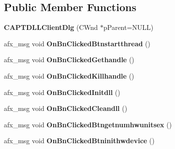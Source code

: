 \subsection*{Public Member Functions}
\begin{DoxyCompactItemize}
\item 
{\bfseries C\+A\+P\+T\+D\+L\+L\+Client\+Dlg} (C\+Wnd $\ast$p\+Parent=N\+U\+LL)\hypertarget{class_c_a_p_t_d_l_l_client_dlg_a697f84919ce4b0bfb2f05746bde3e02a}{}\label{class_c_a_p_t_d_l_l_client_dlg_a697f84919ce4b0bfb2f05746bde3e02a}

\item 
afx\+\_\+msg void {\bfseries On\+Bn\+Clicked\+Btnstartthread} ()\hypertarget{class_c_a_p_t_d_l_l_client_dlg_ac2eee9e2db144b21bb84a856bd5545a6}{}\label{class_c_a_p_t_d_l_l_client_dlg_ac2eee9e2db144b21bb84a856bd5545a6}

\item 
afx\+\_\+msg void {\bfseries On\+Bn\+Clicked\+Gethandle} ()\hypertarget{class_c_a_p_t_d_l_l_client_dlg_a4d648f9524c62291f0d492aa9c005e76}{}\label{class_c_a_p_t_d_l_l_client_dlg_a4d648f9524c62291f0d492aa9c005e76}

\item 
afx\+\_\+msg void {\bfseries On\+Bn\+Clicked\+Killhandle} ()\hypertarget{class_c_a_p_t_d_l_l_client_dlg_ac929793529ec7c2bdf2ec2328b2f7eb6}{}\label{class_c_a_p_t_d_l_l_client_dlg_ac929793529ec7c2bdf2ec2328b2f7eb6}

\item 
afx\+\_\+msg void {\bfseries On\+Bn\+Clicked\+Initdll} ()\hypertarget{class_c_a_p_t_d_l_l_client_dlg_a0f4b47bac8eb0266321bee111d55a9ac}{}\label{class_c_a_p_t_d_l_l_client_dlg_a0f4b47bac8eb0266321bee111d55a9ac}

\item 
afx\+\_\+msg void {\bfseries On\+Bn\+Clicked\+Cleandll} ()\hypertarget{class_c_a_p_t_d_l_l_client_dlg_acbe403ef895a35b76c64348e822e8afd}{}\label{class_c_a_p_t_d_l_l_client_dlg_acbe403ef895a35b76c64348e822e8afd}

\item 
afx\+\_\+msg void {\bfseries On\+Bn\+Clicked\+Btngetnumhwunitsex} ()\hypertarget{class_c_a_p_t_d_l_l_client_dlg_a6ff9530bc5c8bb4261bb6d6cb434c706}{}\label{class_c_a_p_t_d_l_l_client_dlg_a6ff9530bc5c8bb4261bb6d6cb434c706}

\item 
afx\+\_\+msg void {\bfseries On\+Bn\+Clicked\+Btninithwdevice} ()\hypertarget{class_c_a_p_t_d_l_l_client_dlg_a525f959bf83c11924cdc24feae2daf4b}{}\label{class_c_a_p_t_d_l_l_client_dlg_a525f959bf83c11924cdc24feae2daf4b}


\end{DoxyCompactItemize}
